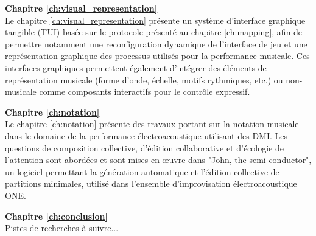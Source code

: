 \textbf{Chapitre \ref{ch:visual_representation}} \\[0.2em]
Le chapitre \ref{ch:visual_representation} présente un système d'interface graphique tangible (TUI) basée sur le protocole présenté au chapitre  \ref{ch:mapping}, afin de permettre notamment une reconfiguration dynamique de l'interface de jeu et une représentation graphique des processus utilisés pour la performance musicale. Ces interfaces graphiques permettent également d'intégrer des éléments de représentation musicale (forme d'onde, échelle, motifs rythmiques, etc.) ou non-musicale comme composants interactifs pour le contrôle expressif.

\textbf{Chapitre \ref{ch:notation}} \\[0.2em]
Le chapitre \ref{ch:notation} présente des travaux portant sur la notation musicale dans le domaine de la performance électroacoustique utilisant des DMI. Les questions de composition collective, d'édition collaborative et d'écologie de l'attention sont abordées et sont mises en œuvre dans "John, the semi-conductor", un logiciel permettant la génération automatique et l'édition collective de partitions minimales, utilisé dans l'ensemble d'improvisation électroacoustique ONE. 

\textbf{Chapitre \ref{ch:conclusion}} \\[0.2em]
Pistes de recherches à suivre...